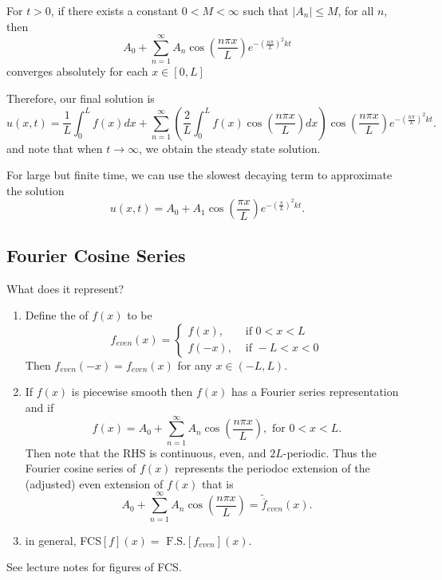 \documentclass[class=article,crop=false]{standalone}
\begin{document}
\begin{thm}[convergence]
For $ t>0$, if there exists a constant  $ 0<M< \infty$ such that $ |A_n|\leq M$, for all $ n$, then
 \[
A_0 + \sum_{ n= 1}^{\infty} A_n \cos \left( \frac{ n\pi x}{ L} \right) e^{-( \frac{ n\pi}{L} )^2 kt} 
\] 
converges absolutely for each $ x \in [0,L]$
\end{thm}
Therefore, our final solution is
\[
	u(x,t) = \frac{1}{L}\int_{0}^{L} f(x) dx + \sum_{ n= 1}^{\infty} \left( \frac{2}{L} \int_{0}^{L} f(x) \cos \left( \frac{ n\pi x}{ L} \right) dx   \right)   \cos \left( \frac{ n\pi x}{ L} \right) e^{-( \frac{ n\pi}{L} )^2 kt} 
.\] 
and note that when $ t \to \infty$, we obtain the steady state solution.

For large but finite time, we can use the slowest decaying term to approximate the solution
\[
	u(x,t) = A_0 + A_1 \cos \left( \frac{ \pi x}{ L} \right) e^{-( \frac{ \pi}{L} )^2 kt} 
.\]

\subsection{Fourier Cosine Series}
What does it represent?
\begin{defn}
\begin{enumerate}[label=\arabic*)]
	\item Define the  of $ f(x)$ to be
		 \begin{equation*}
			 f_{even}(x)=
		\begin{cases}
			f(x), & \text{ if }0<x<L\\
			f(-x), & \text{ if } -L<x<0 
		\end{cases}
		\end{equation*}
		Then $ f_{even}(-x)=f_{even}(x)$ for any $ x \in (-L,L)$.
	\item If $ f(x)$ is piecewise smooth then  $ f(x)$ has a Fourier series representation and if  \[
			f(x) = A_0 + \sum_{ n= 1}^{\infty} A_n \cos \left( \frac{ n\pi x}{ L} \right) , \text{ for } 0<x<L 
	.\] 
	Then note that the RHS is continuous, even, and $ 2L$-periodic. Thus the Fourier cosine series of  $ f(x)$ represents the periodoc extension of the (adjusted) even extension of  $ f(x)$ that is
	 \[
	A_0 + \sum_{ n= 1}^{\infty} A_n \cos \left( \frac{ n\pi x}{ L} \right) = \tilde{ \overline{f}}_{even}( x) 
	.\] 
\item in general, FCS$[f](x) = \text{ F.S.} [ f_{even}]( x)  $.
\end{enumerate}
\end{defn}
\begin{eg}[]
	See lecture notes for figures of FCS.
\end{eg}
\end{document}
